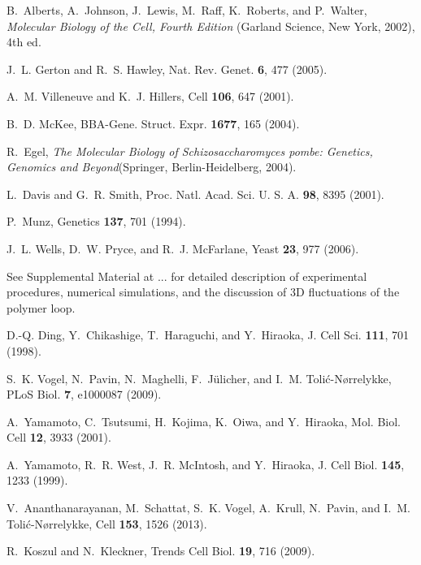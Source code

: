 \documentclass[aps,showpacs,twocolumn,floatfix,prx,superscriptaddress]{revtex4-1}
\begin{document}
\begin{thebibliography}{10}


B.~Alberts,
  A.~Johnson,
  J.~Lewis,
  M.~Raff,
  K.~Roberts, and
  P.~Walter,
  \emph{Molecular Biology of the Cell, Fourth Edition}
  (Garland Science, New York, 2002),
  4th ed.

J.~L. Gerton and
  R.~S. Hawley,
  Nat. Rev. Genet. \textbf{6},
  477 (2005).

A.~M. Villeneuve
  and K.~J.
  Hillers, Cell
  \textbf{106}, 647 (2001).

B.~D. McKee,
  BBA-Gene. Struct. Expr. \textbf{1677}, 165 
  (2004).

R.~Egel,
  \emph{The Molecular Biology of Schizosaccharomyces pombe:
  Genetics, Genomics and Beyond}(Springer, Berlin-Heidelberg,
  2004).

L.~Davis and
  G.~R. Smith,
  Proc. Natl. Acad. Sci. U. S. A.
  \textbf{98}, 8395 (2001).

P.~Munz,
  Genetics \textbf{137},
  701 (1994).

J.~L. Wells,
  D.~W. Pryce, and
  R.~J. McFarlane,
  Yeast \textbf{23}, 977
  (2006).
  
  See Supplemental Material at ... for detailed description of experimental procedures, numerical simulations, and the discussion of 3D fluctuations of the polymer loop.

D.-Q. Ding,
  Y.~Chikashige,
  T.~Haraguchi,
  and Y.~Hiraoka,
  J. Cell Sci. \textbf{111},
  701 (1998).

S.~K. Vogel,
  N.~Pavin,
  N.~Maghelli,
  F.~J\"ulicher,
  and I.~M.
  Toli\'c-N\o rrelykke, PLoS Biol.
  \textbf{7}, e1000087
  (2009).

A.~Yamamoto,
  C.~Tsutsumi,
  H.~Kojima,
  K.~Oiwa, and
  Y.~Hiraoka,
  Mol. Biol. Cell \textbf{12},
  3933 (2001).

A.~Yamamoto,
  R.~R. West,
  J.~R. McIntosh,
  and Y.~Hiraoka,
  J. Cell Biol.
  \textbf{145}, 1233 (1999).

V.~Ananthanarayanan,
  M.~Schattat,
  S.~K. Vogel,
  A.~Krull,
  N.~Pavin, and
  I.~M. Toli\'c-N\o rrelykke,
  Cell \textbf{153}, 1526
  (2013).

R.~Koszul and
  N.~Kleckner,
  Trends Cell Biol. \textbf{19},
  716 (2009).


\end{thebibliography}
\end{document}
